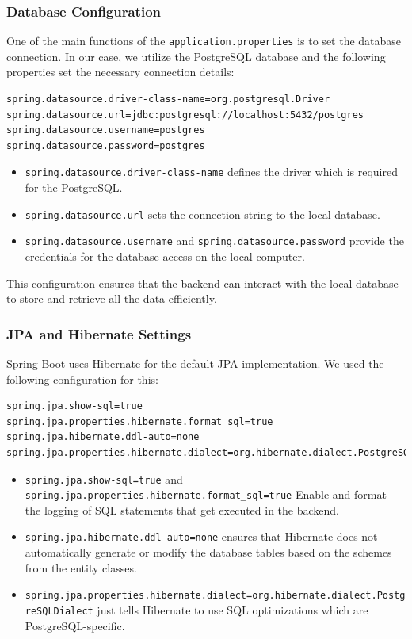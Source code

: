         \subsubsection{Database Configuration}
        One of the main functions of the \texttt{application.properties} is to set the database connection. In our case, we utilize the PostgreSQL database and the following properties set the necessary connection details:
        \lstset{style=mycsharp, caption=Database Configuration}
        \begin{lstlisting}
spring.datasource.driver-class-name=org.postgresql.Driver
spring.datasource.url=jdbc:postgresql://localhost:5432/postgres
spring.datasource.username=postgres
spring.datasource.password=postgres
        \end{lstlisting}
        \begin{itemize}
            \item \texttt{spring.datasource.driver-class-name} defines the driver which is required for the PostgreSQL.
            \item \texttt{spring.datasource.url} sets the connection string to the local database.
            \item \texttt{spring.datasource.username} and \texttt{spring.datasource.password} provide the credentials for the database access on the local computer.
        \end{itemize}
        This configuration ensures that the backend can interact with the local database to store and retrieve all the data efficiently.

        \subsubsection{JPA and Hibernate Settings}
        Spring Boot uses Hibernate for the default JPA implementation. We used the following configuration for this:
        \lstset{style=mycsharp, caption=JPA/Hibernate Settings}
        \begin{lstlisting}
spring.jpa.show-sql=true
spring.jpa.properties.hibernate.format_sql=true
spring.jpa.hibernate.ddl-auto=none
spring.jpa.properties.hibernate.dialect=org.hibernate.dialect.PostgreSQLDialect
        \end{lstlisting} 

        \begin{itemize}
            \item \texttt{spring.jpa.show-sql=true} and \verb|spring.jpa.properties.hibernate.format_sql=true| Enable and format the logging of SQL statements that get executed in the backend.
            \item \texttt{spring.jpa.hibernate.ddl-auto=none} ensures that Hibernate does not automatically generate or modify the database tables based on the schemes from the entity classes.
            \item \texttt{spring.jpa.properties.hibernate.dialect=org.hibernate.dialect.PostgreSQLDialect} just tells Hibernate to use SQL optimizations which are PostgreSQL-specific.
        \end{itemize}
        
